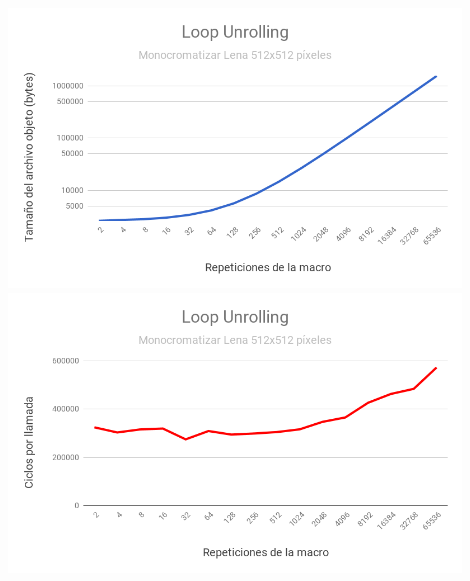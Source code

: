 \begin{center}

	\includegraphics[width=0.9\textwidth]{imagenes/loopunrolling/size.png} \\
	\includegraphics[width=0.9\textwidth]{imagenes/loopunrolling/time.png}

\end{center}


